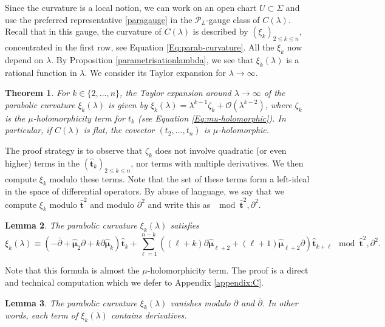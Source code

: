 \documentclass[11pt]{amsart}
\newtheorem{thm}{Theorem}
\newtheorem{lemma}[thm]{Lemma}
\numberwithin{thm}{section} %
\numberwithin{equation}{section} %
\numberwithin{figure}{section} %
\renewcommand*{\l}{\lambda}
\newcommand*{\del}{\partial}
\begin{document}
Since the curvature is a local notion, we can work on an open chart $U\subset \Sigma$ and use the preferred representative \eqref{paragauge} in the $\mathcal{P}_L$-gauge class of $C(\l)$. Recall that in this gauge, the curvature of $C(\l)$ is described by $(\xi_k)_{2\leq k\leq n}$, concentrated in the first row, see Equation \eqref{Eq:parab-curvature}. All the $\xi_k$ now depend on $\l$. By Proposition \ref{parametrisationlambda}, we see that $\xi_k(\l)$ is a rational function in $\l$. We consider its Taylor expansion for $\l\to\infty$.

\begin{thm}\label{conditioncinconnection}
For $k\in\{2,...,n\}$, the Taylor expansion around $\l\to\infty$ of the parabolic curvature $\xi_k(\l)$ is given by $\xi_k(\l)=\l^{k-1}\zeta_k+\mathcal{O}(\l^{k-2})$, where $\zeta_k$ is the $\mu$-holomorphicity term for $t_k$ (see Equation \eqref{Eq:mu-holomorphic}). In particular, if $C(\l)$ is flat, the covector $(t_2,...,t_n)$ is $\mu$-holomorphic.
\end{thm}

The proof strategy is to observe that $\zeta_k$ does not involve quadratic (or even higher) terms in the $(\bm\hat{t}_k)_{2\leq k\leq n}$, nor terms with multiple derivatives. We then compute $\xi_k$ modulo these terms. Note that the set of these terms form a left-ideal in the space of differential operators. By abuse of language, we say that we compute $\xi_k$ modulo $\bm\hat{t}^2$ and modulo $\partial^2$ and write this as $\mod \bm\hat{t}^2,\partial^2$.

\begin{lemma}\label{curvaturemodmod}
The parabolic curvature $\xi_k(\l)$ satisfies
$$\xi_k(\l) \equiv (-\bar{\partial}\!+\!\bm\hat{\mu}_2\partial\!+\!k\partial\bm\hat{\mu}_k)\bm\hat{t}_k+\sum_{\ell=1}^{n-k}\left((\ell\!+\!k)\partial\bm\hat{\mu}_{\ell+2}+(\ell\!+\!1)\bm\hat{\mu}_{\ell+2}\del\right)\bm\hat{t}_{k+\ell} \mod \bm\hat{t}^2,\partial^2.$$
\end{lemma}

Note that this formula is almost the $\mu$-holomorphicity term. The proof is a direct and technical computation which we defer to Appendix \ref{appendix:C}.

\begin{lemma}\label{curvature-mod-derivatives}
The parabolic curvature $\xi_k(\l)$ vanishes modulo $\partial$ and $\bar\partial$. In other words, each term of $\xi_k(\l)$ contains derivatives.
\end{lemma}
\end{document}
